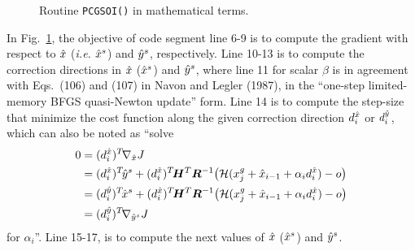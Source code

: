 \documentclass{article}
\begin{document}
%
\begin{figure}[hb]

\caption{Routine {\tt PCGSOI()} in mathematical terms.}
\label{alg:algo}
\end{figure}

In Fig.~\ref{alg:algo},
the objective of code segment line 6-9 is to compute the gradient
with respect to ${\hat{x}}$ ({\em i.e.} ${{\hat{x}}^s}$) and ${{\hat{y}}^s}$,
respectively.  Line 10-13 is to compute the correction directions
in ${\hat{x}}$ (${{\hat{x}}^s}$) and ${{\hat{y}}^s}$, where line 11 for
scalar $\beta$
is in agreement with Eqs.~(106) and (107) in Navon and Legler (1987),
in the ``one-step limited-memory BFGS quasi-Newton update'' form.
Line 14 is to compute the step-size
that minimize the cost function along the given correction direction
$d^{\hat{x}}_i$ or $d^{\hat{y}}_i$, which
can also be noted as ``solve
\begin{align*}
0 &=(d^{\hat{x}}_i)^T\!\nabla_{\hat{x}} J	\\
  &=(d^{\hat{x}}_i)^T\!{{\hat{y}}^s} +
    (d^{\hat{x}}_i)^T\!\bm H^T{\bm R}^{-1}
	\bigl({\mathcal H}(x_j^g+{\hat{x}}_{i-1}+\alpha_id^{\hat{x}}_i)-o\bigr)	\\
  &=(d^{\hat{y}}_i)^T\!{{\hat{x}}^s} +
    (d^{\hat{x}}_i)^T\!\bm H^T{\bm R}^{-1}
	\bigl({\mathcal H}(x_j^g+{\hat{x}}_{i-1}+\alpha_id^{\hat{x}}_i)-o\bigr)	\\
  &=(d^{\hat{y}}_i)^T\!\nabla_{{\hat{y}}^s} J
\end{align*}
for $\alpha_i$''.
Line 15-17, is to compute the next values of ${\hat{x}}$ (${{\hat{x}}^s}$)
and ${{\hat{y}}^s}$.
\end{document}
